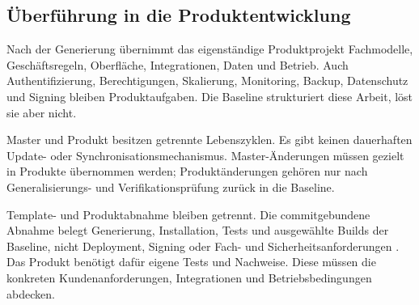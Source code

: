 \subsection{Überführung in die Produktentwicklung}
\label{subsec:ueberfuehrung-produktentwicklung}

Nach der Generierung übernimmt das eigenständige Produktprojekt Fachmodelle,
Geschäftsregeln, Oberfläche, Integrationen, Daten und Betrieb. Auch
Authentifizierung, Berechtigungen, Skalierung, Monitoring, Backup, Datenschutz
und Signing bleiben Produktaufgaben. Die Baseline strukturiert diese Arbeit,
löst sie aber nicht.

Master und Produkt besitzen getrennte Lebenszyklen. Es gibt keinen dauerhaften
Update- oder Synchronisationsmechanismus. Master-Änderungen müssen gezielt in
Produkte übernommen werden; Produktänderungen gehören nur nach
Generalisierungs- und Verifikationsprüfung zurück in die Baseline.

Template- und Produktabnahme bleiben getrennt. Die commitgebundene Abnahme
belegt Generierung, Installation, Tests und ausgewählte Builds der Baseline,
nicht Deployment, Signing oder Fach- und Sicherheitsanforderungen
\parencite{kleiveist2026acceptance}. Das Produkt benötigt dafür eigene Tests
und Nachweise.
Diese müssen die konkreten Kundenanforderungen, Integrationen und
Betriebsbedingungen abdecken.
